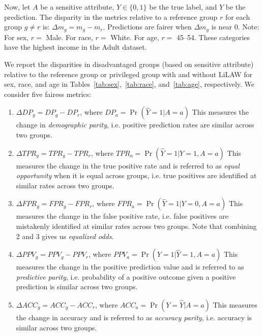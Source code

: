 \documentclass{article}
\theoremstyle{plain}
\theoremstyle{definition}
\theoremstyle{remark}
\begin{document}
Now, let $A$ be a sensitive attribute, $Y\in\{0,1\}$ be the true label, and $\hat{Y}$ be the prediction. The disparity in the metrics relative to a reference group $r$ for each group $g \neq r$ is: $\Delta m_g = m_g - m_r$. Predictions are fairer when $\Delta m_g$ is near 0. Note: For sex, $r =$ Male. For race, $r =$ White. For age, $r =$ 45--54. These categories have the highest income in the Adult dataset.

We report the disparities in disadvantaged groups (based on sensitive attribute) relative to the reference group or privileged group with and without LiLAW for sex, race, and age in Tables~\ref{tab:sex},~\ref{tab:race}, and~\ref{tab:age}, respectively. We consider five fairess metrics:
\begin{enumerate}
\vspace{-0.3em}
    \item $\Delta DP_g = DP_g - DP_r$, where $DP_a = \Pr(\hat{Y}=1|A=a)$\newline
    This measures the change in \textit{demographic parity}, i.e. positive prediction rates are similar across two groups.
\vspace{-0.3em}
    \item $\Delta TPR_g = TPR_g - TPR_r$, where $TPR_a = \Pr(\hat{Y}=1|Y=1,A=a)$\newline
    This measures the change in the true positive rate and is referred to as \textit{equal opportunity} when it is equal across groups, i.e. true positives are identified at similar rates across two groups.
\vspace{-0.3em}
    \item $\Delta FPR_g = FPR_g - FPR_r$, where $FPR_a = \Pr(\hat{Y}=1|Y=0,A=a)$\newline
    This measures the change in the false positive rate, i.e. false positives are mistakenly identified at similar rates across two groups. Note that combining 2 and 3 gives us \textit{equalized odds}.
\vspace{-0.3em}
    \item $\Delta PPV_g = PPV_g - PPV_r$, where $PPV_a = \Pr(Y=1|\hat{Y}=1,A=a)$\newline
    This measures the change in the positive prediction value and is referred to as \textit{predictive parity}, i.e. probability of a positive outcome given a positive prediction is similar across two groups.
\vspace{-0.3em}
    \item $\Delta ACC_g = ACC_g - ACC_r$, where $ACC_a = \Pr(Y=\hat{Y}|A=a)$\newline
    This measures the change in accuracy and is referred to as \textit{accuracy parity}, i.e. accuracy is similar across two groups.
\end{enumerate}
\end{document}
